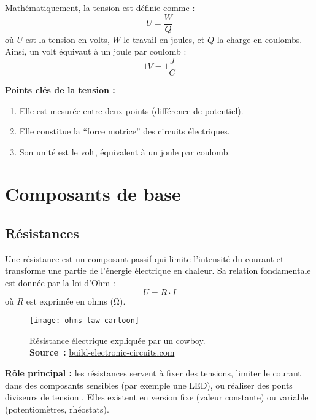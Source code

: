 Mathématiquement, la tension est définie comme :
\[
  U = \frac{W}{Q}
\]
où \(U\) est la tension en volts, \(W\) le travail en joules, et \(Q\) la charge
en coulombs. Ainsi, un volt équivaut à un joule par coulomb :
\[
1V=1\frac{J}{C}
\]


\vspace{\baselineskip}
\begin{Note}
\textbf{Points clés de la tension :}
\begin{enumerate}
  \item Elle est mesurée entre deux points (différence de potentiel).
  \item Elle constitue la “force motrice” des circuits électriques.
  \item Son unité est le volt, équivalent à un joule par coulomb.
\end{enumerate}
\end{Note}


\section{Composants de base} \label{subsec:basic_components}
\subsection{Résistances} \label{subsec:resistors}
Une résistance est un composant passif qui limite l’intensité du courant
et transforme une partie de l’énergie électrique en chaleur.
Sa relation fondamentale est donnée par la loi d’Ohm :
\[
U = R \cdot I
\]
où \(R\) est exprimée en ohms (\unit{\ohm}).

\begin{figure}[H]
    \centering
    \texttt{[image: ohms-law-cartoon]}
    \caption{
        \centering
        R\'esistance \'electrique expliqu\'ee par un cowboy.\\
        \textbf{Source~:}
        \href{https://build-electronic-circuits.com/ohms-law}{build-electronic-circuits.com}
    }

\end{figure}


\textbf{Rôle principal :} les résistances servent à fixer des tensions, limiter
le courant dans des composants sensibles (par exemple une LED), ou réaliser
des ponts diviseurs de tension . Elles existent en version fixe (valeur constante)
ou variable (potentiomètres, rhéostats).


